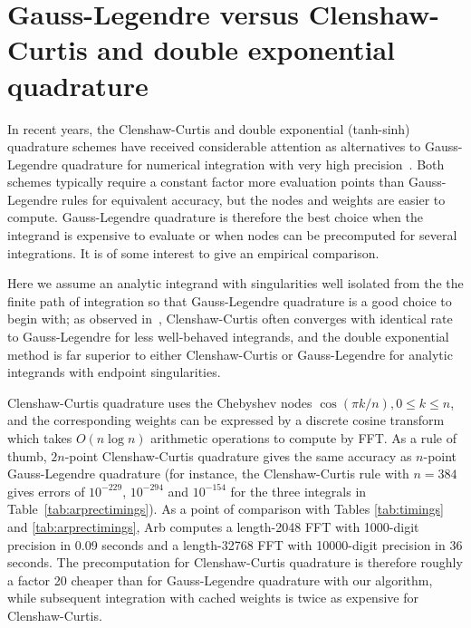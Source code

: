 \documentclass[11pt,a4paper]{article}
\begin{document}
\section{Gauss-Legendre versus Clenshaw-Curtis and double exponential quadrature}

\label{sec:vsothers}

In recent years, the Clenshaw-Curtis and double exponential (tanh-sinh) quadrature schemes
have received considerable attention as alternatives to Gauss-Legendre
quadrature for numerical integration with very high precision~\cite{bailey2011high,trefethen2008gauss}.
Both schemes
typically require a constant factor more evaluation points than Gauss-Legendre rules
for equivalent accuracy, but the nodes and weights are easier to compute.
Gauss-Legendre quadrature is therefore the best choice
when the integrand is expensive to evaluate or when nodes can
be precomputed for several integrations.
It is of some interest to give an empirical comparison.

Here we assume an analytic integrand with singularities well isolated from the
the finite path of integration so that Gauss-Legendre quadrature is a good
choice to begin with; as observed in~\cite{trefethen2008gauss},
Clenshaw-Curtis often converges with identical rate to Gauss-Legendre for
less well-behaved integrands,
and the double exponential method is far superior to either
Clenshaw-Curtis or Gauss-Legendre for
analytic integrands with endpoint singularities.

Clenshaw-Curtis quadrature uses the Chebyshev nodes
$\cos(\pi k / n), 0 \le k \le n$, and the corresponding weights can be expressed
by a discrete cosine transform which takes $O(n \log n)$
arithmetic operations to compute by FFT.
As a rule of thumb, $2n$-point Clenshaw-Curtis quadrature
gives the same accuracy as $n$-point Gauss-Legendre quadrature
(for instance, the Clenshaw-Curtis rule with $n = 384$ gives
errors of $10^{-229}$, $10^{-294}$ and $10^{-154}$ for the three
integrals in Table~\ref{tab:arprectimings}).
As a point of comparison with Tables \ref{tab:timings} and \ref{tab:arprectimings},
Arb computes a length-2048 FFT with 1000-digit precision
in 0.09 seconds and a length-32768 FFT with 10000-digit precision
in 36 seconds.
The precomputation for Clenshaw-Curtis quadrature is therefore
roughly a factor 20 cheaper than for Gauss-Legendre quadrature
with our algorithm, while subsequent integration with
cached weights is twice as expensive for Clenshaw-Curtis.
\end{document}
